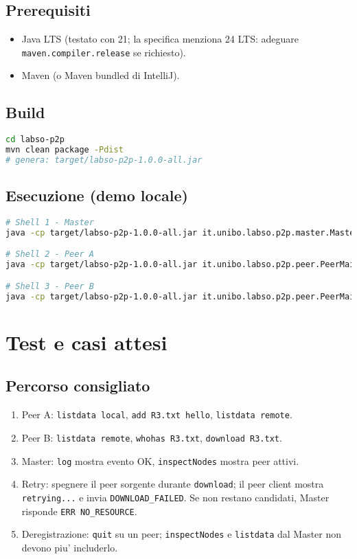 \documentclass[a4paper,12pt]{article}
\begin{document}
\subsection*{Prerequisiti}
\begin{itemize}[nosep]
  \item Java LTS (testato con 21; la specifica menziona 24 LTS: adeguare \texttt{maven.compiler.release} se richiesto).
  \item Maven (o Maven bundled di IntelliJ).
\end{itemize}

\subsection*{Build}
\begin{lstlisting}[language=bash]
cd labso-p2p
mvn clean package -Pdist
# genera: target/labso-p2p-1.0.0-all.jar
\end{lstlisting}

\subsection*{Esecuzione (demo locale)}
\begin{lstlisting}[language=bash]
# Shell 1 - Master
java -cp target/labso-p2p-1.0.0-all.jar it.unibo.labso.p2p.master.MasterMain 9000

# Shell 2 - Peer A
java -cp target/labso-p2p-1.0.0-all.jar it.unibo.labso.p2p.peer.PeerMain 127.0.0.1 9000 ./data/peer-A

# Shell 3 - Peer B
java -cp target/labso-p2p-1.0.0-all.jar it.unibo.labso.p2p.peer.PeerMain 127.0.0.1 9000 ./data/peer-B
\end{lstlisting}

\section{Test e casi attesi}
\subsection*{Percorso consigliato}
\begin{enumerate}[nosep]
  \item Peer A: \texttt{listdata local}, \texttt{add R3.txt hello}, \texttt{listdata remote}.
  \item Peer B: \texttt{listdata remote}, \texttt{whohas R3.txt}, \texttt{download R3.txt}.
  \item Master: \texttt{log} mostra evento OK, \texttt{inspectNodes} mostra peer attivi.
  \item Retry: spegnere il peer sorgente durante \texttt{download}; il peer client mostra \texttt{retrying...} e invia \texttt{DOWNLOAD\_FAILED}. Se non restano candidati, Master risponde \texttt{ERR NO\_RESOURCE}.
  \item Deregistrazione: \texttt{quit} su un peer; \texttt{inspectNodes} e \texttt{listdata} dal Master non devono piu' includerlo.
\end{enumerate}
\end{document}
